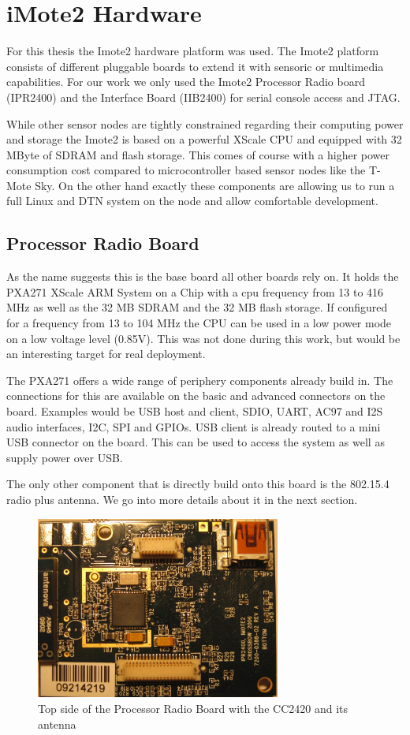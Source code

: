 \chapter{iMote2 Hardware}
For this thesis the Imote2 hardware platform was used. The Imote2 platform
consists of different pluggable boards to extend it with sensoric or multimedia
capabilities. For our work we only used the Imote2 Processor Radio board
(IPR2400) and the Interface Board (IIB2400) for serial console access and JTAG.

While other sensor nodes are tightly constrained regarding their computing power
and storage the Imote2 is based on a powerful XScale CPU and equipped with 32
MByte of SDRAM and flash storage. This comes of course with a higher power
consumption cost compared to microcontroller based sensor nodes like the T-Mote
Sky. On the other hand exactly these components are allowing us to run a full
Linux and DTN system on the node and allow comfortable development.

\section{Processor Radio Board}
As the name suggests this is the base board all other boards rely on. It holds
the PXA271 XScale ARM System on a Chip with a cpu frequency from 13 to 416 MHz
as well as the 32 MB SDRAM and the 32 MB flash storage. If configured for a
frequency from 13 to 104 MHz the CPU can be used in a low power mode on a low
voltage level (0.85V). This was not done during this work, but would be an
interesting target for real deployment.

The PXA271 offers a wide range of periphery components already build in. The
connections for this are available on the basic and advanced connectors on the
board. Examples would be USB host and client, SDIO, UART, AC97 and I2S audio
interfaces, I2C, SPI and GPIOs. USB client is already routed to a mini USB
connector on the board. This can be used to access the system as well as supply
power over USB.

The only other component that is directly build onto this board is the 802.15.4
radio plus antenna. We go into more details about it in the next section.

\begin{figure}
  \begin{center}
    \includegraphics[height=6cm]{images/imote_top_cutted}
    \caption{Top side of the Processor Radio Board with the CC2420 and its antenna}
        \label{fig:imote2top}
  \end{center}
\end{figure}

